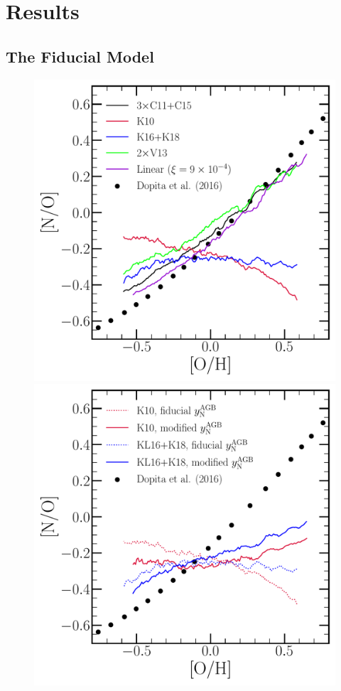 \documentclass[ms.tex]{subfiles}
\begin{document}
 

\section{Results} 
\label{sec:results} 

\subsection{The Fiducial Model} 
\label{sec:results:fiducial} 

\begin{figure} 
\centering 
\includegraphics[scale = 0.45]{no_oh_predictions.pdf} 
\includegraphics[scale = 0.45]{no_oh_predictions_karakas.pdf} 

\end{figure}
\end{document}
